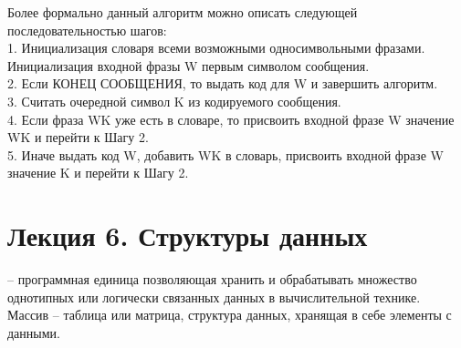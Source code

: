 \documentclass[a4paper, 12pt]{article}
\begin{document}
 Более формально данный алгоритм можно описать следующей последовательностью шагов:\\
    1. Инициализация словаря всеми возможными односимвольными фразами. Инициализация входной фразы W первым символом сообщения.\\
    2. Если КОНЕЦ СООБЩЕНИЯ, то выдать код для W и завершить алгоритм.\\
    3. Считать очередной символ K из кодируемого сообщения.\\
    4. Если фраза WK уже есть в словаре, то присвоить входной фразе W значение WK и перейти к Шагу 2.\\
    5. Иначе выдать код W, добавить WK в словарь, присвоить входной фразе W значение K и перейти к Шагу 2.\\



\section*{Лекция 6. Структуры данных}
-- программная единица позволяющая хранить и обрабатывать множество однотипных или логически связанных данных в вычислительной технике.\\

Массив -- таблица или матрица, структура данных, хранящая в себе элементы с данными.
\end{document}
